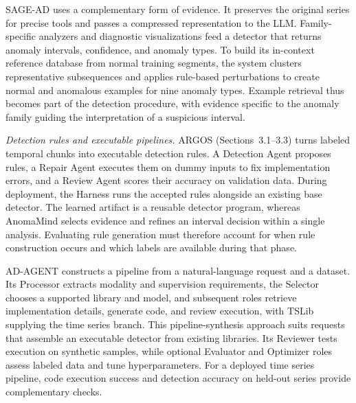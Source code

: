 \documentclass[preprints,article,submit,moreauthors]{Definitions/mdpi}
\begin{document}
SAGE-AD \citep{sagead2026} uses a complementary form of evidence. It preserves the original series for precise tools and passes a compressed representation to the LLM. Family-specific analyzers and diagnostic visualizations feed a detector that returns anomaly intervals, confidence, and anomaly types. To build its in-context reference database from normal training segments, the system clusters representative subsequences and applies rule-based perturbations to create normal and anomalous examples for nine anomaly types. Example retrieval thus becomes part of the detection procedure, with evidence specific to the anomaly family guiding the interpretation of a suspicious interval.

\textit{Detection rules and executable pipelines.} ARGOS \citep{argos2025} (Sections~3.1--3.3) turns labeled temporal chunks into executable detection rules. A Detection Agent proposes rules, a Repair Agent executes them on dummy inputs to fix implementation errors, and a Review Agent scores their accuracy on validation data. During deployment, the Harness runs the accepted rules alongside an existing base detector. The learned artifact is a reusable detector program, whereas AnomaMind selects evidence and refines an interval decision within a single analysis. Evaluating rule generation must therefore account for when rule construction occurs and which labels are available during that phase.

AD-AGENT \citep{adagent2025} constructs a pipeline from a natural-language request and a dataset. Its Processor extracts modality and supervision requirements, the Selector chooses a supported library and model, and subsequent roles retrieve implementation details, generate code, and review execution, with TSLib supplying the time series branch. This pipeline-synthesis approach suits requests that assemble an executable detector from existing libraries. Its Reviewer tests execution on synthetic samples, while optional Evaluator and Optimizer roles assess labeled data and tune hyperparameters. For a deployed time series pipeline, code execution success and detection accuracy on held-out series provide complementary checks.
\end{document}
